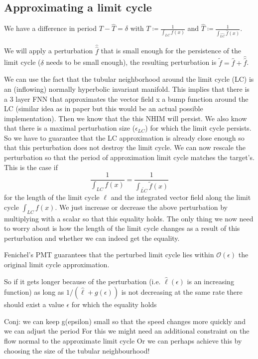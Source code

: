 \documentclass{article}
\theoremstyle{definition}
\theoremstyle{remark}
\begin{document}
\subsection{Approximating a limit cycle}

We have a difference in period $T-\hat T = \delta$
with $T\coloneqq\frac{1}{\int_{LC}f(x)}$ and $\hat T\coloneqq\frac{1}{\int_{\hat{LC}}\hat f(x)}$.


We will apply a perturbation $\hat{\hat{f}}$ that is small enough for the persistence of the limit cycle ($\delta$ needs to be small enough), 
the resulting perturbation is $\tilde{f}=\hat{f}+\hat{\hat{f}}$.

We can use the fact that the tubular neighborhood around the limit cycle (LC) is an (inflowing) normally hyperbolic invariant manifold.
This implies that there is a 3 layer FNN that approximates the vector field x a bump function around the LC (similar idea as in paper but this would be an actual possible implementation).
Then we know that the this NHIM will persist.
We also know that there is a maximal perturbation size ($\epsilon_{LC}$) for which the limit cycle persists.
So we have to guarantee that the LC approximation is already close enough so that this perturbation does not destroy the limit cycle.
We can now rescale the perturbation so that the period of approximation limit cycle matches the target's. This is the case if 
\[\frac{1}{\int_{LC}f(x)} =  \frac{1}{\int_{\tilde{LC}}\tilde{f}(x)}\] for the length of the limit cycle $\ell$ and the integrated vector field along the limit cycle $\int_{LC}f(x)$.
We just increase or decrease  the above perturbation by multiplying with a scalar so that this equality holds.
The only thing we now need to worry about is how the length of the limit cycle changes as a result of this perturbation and whether we can indeed get the equality.

Fenichel's PMT guarantees that the perturbed limit cycle lies within $\mathcal{O}(\epsilon)$ the original limit cycle approximation.

So if it gets longer because of the perturbation (i.e. $\hat \ell(\epsilon)$ is an increasing function) as long as $1/(\hat \ell+g(\epsilon))$ is not decreasing at the same rate there should exist a value $\epsilon$ for which the equality holds




Conj: we can keep g(epsilon) small so that the speed changes more quickly and we can adjust the period
For this we might need an additional constraint on the flow normal to the approximate limit cycle
Or we can perhaps achieve this by choosing the size of the tubular neighbourhood!
\end{document}
